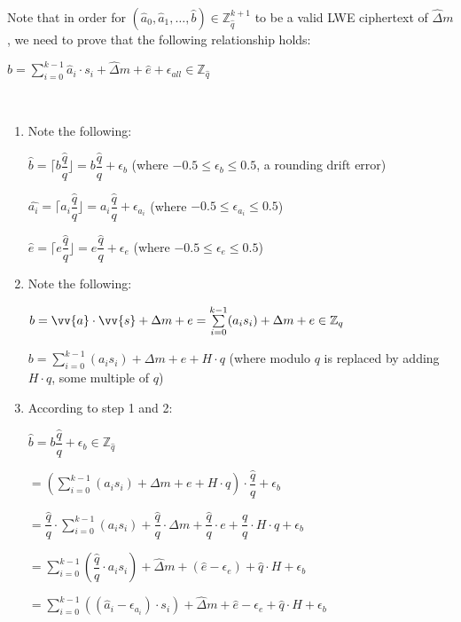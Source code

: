 $ $

 Note that in order for $(\hat{a}_0, \hat{a}_1, \ldots, \hat{b}) \in \mathbb{Z}_{\hat{q}}^{k + 1}$ to be a valid LWE ciphertext of $\hat{\Delta}m$, we need to prove that the following relationship holds:

$\hat{b} = \sum\limits_{i=0}^{k-1}\hat{a}_i \cdot s_i + \hat{\Delta} m + \hat{e}+\epsilon_{\textit{all}} \in \mathbb{Z}_{\hat{q}}$

$ $

\begin{myproof}
\begin{enumerate}
\item Note the following: 

$\hat{b} = \Big\lceil b \dfrac{\hat{q}}{q} \Big\rfloor = b\dfrac{\hat{q}}{q} + \epsilon_b$ (where $-0.5 \le \epsilon_b \le 0.5$, a rounding drift error)

$\hat{a_i} = \Big\lceil a_i \dfrac{\hat{q}}{q} \Big\rfloor = a_i\dfrac{\hat{q}}{q} + \epsilon_{a_i}$ (where $-0.5 \le \epsilon_{a_i} \le 0.5$)

$\hat{e} = \Big\lceil e \dfrac{\hat{q}}{q} \Big\rfloor = e\dfrac{\hat{q}}{q} + \epsilon_e$ (where $-0.5 \le \epsilon_e \le 0.5$)
\item Note the following: 

$b = \vv{a} \cdot \vv{s} + \Delta  m + e = \sum\limits_{i=0}^{k-1}(a_is_i) + \Delta m + e  \in \mathbb{Z}_q$

$b = \sum\limits_{i=0}^{k-1}(a_is_i) + \Delta m + e + H \cdot q$ (where modulo $q$ is replaced by adding $H \cdot q$, some multiple of $q$)

\item According to step 1 and 2:

$\hat{b} = b\dfrac{\hat{q}}{q} + \epsilon_b \in \mathbb{Z}_{\hat{q}}$

$= \left(\sum\limits_{i=0}^{k-1}(a_is_i) + \Delta m + e + H \cdot q\right) \cdot \dfrac{\hat{q}}{q}  + \epsilon_b$

$= \dfrac{\hat{q}}{q} \cdot \sum\limits_{i=0}^{k-1}(a_is_i) + \dfrac{\hat{q}}{q} \cdot \Delta m + \dfrac{\hat{q}}{q} \cdot e + \dfrac{\hat{q}}{q} \cdot H \cdot q + \epsilon_b$

$= \sum\limits_{i=0}^{k-1}\left(\dfrac{\hat{q}}{q} \cdot a_is_i\right) + \hat{\Delta} m + (\hat{e} - \epsilon_e) + \hat{q}\cdot H + \epsilon_b$

$= \sum\limits_{i=0}^{k-1}\left((\hat{a}_i - \epsilon_{a_i}) \cdot s_i\right) + \hat{\Delta} m + \hat{e} - \epsilon_e + \hat{q}\cdot H + \epsilon_b$


\end{enumerate}
\end{myproof}
